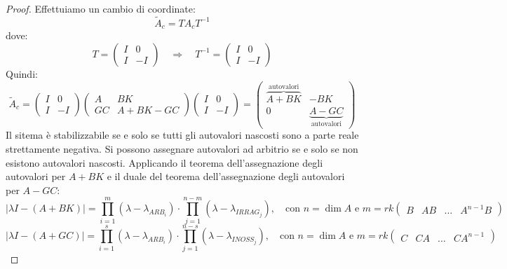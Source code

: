 \documentclass{report}
\theoremstyle{nostyle}
\begin{document}
\begin{proof}
Effettuiamo un cambio di coordinate:
\[   \widetilde{A}_c = T A_c T^{-1} \]
dove:
\[       T = \begin{pmatrix}
    I & 0 \\ I & -I
\end{pmatrix}    \quad \Longrightarrow \quad T^{-1} = \begin{pmatrix}
    I & 0 \\ I & -I
\end{pmatrix}           \]
Quindi:
\[      \widetilde{A}_c = \begin{pmatrix}
    I & 0 \\ I & -I
\end{pmatrix}     \begin{pmatrix}
    A & BK \\ GC & A+BK-GC
\end{pmatrix}    \begin{pmatrix}
     I & 0 \\ I & -I
\end{pmatrix}      = \begin{pmatrix}
    \overbrace{A+BK}^{\text{autovalori}} & -BK \\ 0 & \underbrace{A-GC}_{\text{autovalori}}
\end{pmatrix} \]
Il sitema è stabilizzabile se e solo se tutti gli autovalori nascosti sono a parte reale strettamente negativa. Si possono assegnare autovalori ad arbitrio se e solo se non esistono autovalori nascosti.
Applicando il teorema dell'assegnazione degli autovalori per $A+BK$ e il duale del teorema dell'assegnazione degli autovalori per $A-GC$:
\[ \left|  \lambda I -(A+BK)   \right|   = \prod_{i = 1}^{m} (\lambda - \lambda_{ARB_i}) \cdot \prod_{j = 1}^{n-m} (\lambda-\lambda_{IRRAG_j}) , \quad \text{con } n = \dim A \text{ e } m = rk \begin{pmatrix}
    B & AB & \dots & A^{n-1}B
\end{pmatrix} \]
\[   \left|  \lambda I -(A+GC)   \right|   = \prod_{i = 1}^{s} (\lambda - \lambda_{ARB_i}) \cdot \prod_{j = 1}^{n-s} (\lambda-\lambda_{INOSS_j}) , \quad \text{con } n = \dim A \text{ e } m = rk \begin{pmatrix}
    C & CA & \dots & CA^{n-1}
\end{pmatrix}    \]









\end{proof}
\end{document}
